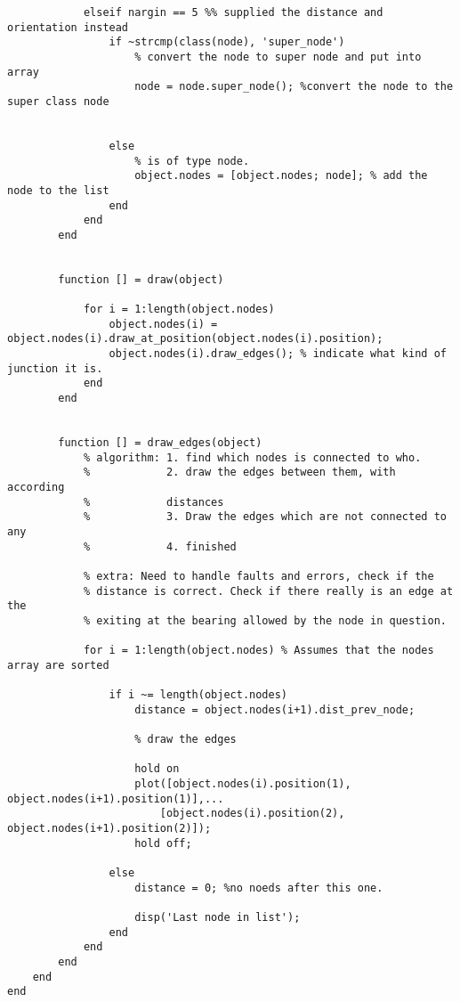 \begin{lstlisting}
            elseif nargin == 5 %% supplied the distance and orientation instead
                if ~strcmp(class(node), 'super_node')
                    % convert the node to super node and put into array
                    node = node.super_node(); %convert the node to the super class node
                    
                                    
                else
                    % is of type node.
                    object.nodes = [object.nodes; node]; % add the node to the list
                end 
            end
        end
              
                
        function [] = draw(object)
            
            for i = 1:length(object.nodes)
                object.nodes(i) = object.nodes(i).draw_at_position(object.nodes(i).position);
                object.nodes(i).draw_edges(); % indicate what kind of junction it is.
            end
        end
        
        
        function [] = draw_edges(object)
            % algorithm: 1. find which nodes is connected to who.
            %            2. draw the edges between them, with according
            %            distances
            %            3. Draw the edges which are not connected to any
            %            4. finished
            
            % extra: Need to handle faults and errors, check if the
            % distance is correct. Check if there really is an edge at the
            % exiting at the bearing allowed by the node in question.
            
            for i = 1:length(object.nodes) % Assumes that the nodes array are sorted 
           
                if i ~= length(object.nodes)
                    distance = object.nodes(i+1).dist_prev_node;
                    
                    % draw the edges
                    
                    hold on
                    plot([object.nodes(i).position(1), object.nodes(i+1).position(1)],...
                        [object.nodes(i).position(2), object.nodes(i+1).position(2)]);
                    hold off;
                                        
                else
                    distance = 0; %no noeds after this one.
                    
                    disp('Last node in list');
                end
            end
        end
    end
end

\end{lstlisting}


